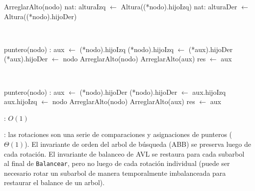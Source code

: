 \begin{Algoritmos}
	\begin{algorithm}[H]
		\NoCaptionOfAlgo
		\caption{}
		\BlankLine
		ArreglarAlto(nodo)
		nat: alturaIzq $\leftarrow$ Altura((*nodo).hijoIzq)
		nat: alturaDer $\leftarrow$ Altura((*nodo).hijoDer)
	\end{algorithm}

	~

	\begin{algorithm}[H]
		\NoCaptionOfAlgo
		\caption{}
		\BlankLine
		puntero(nodo) : aux $\leftarrow$ (*nodo).hijoIzq
		(*nodo).hijoIzq $\leftarrow$ (*aux).hijoDer
		(*aux).hijoDer $\leftarrow$ nodo
		ArreglarAlto(nodo)
		ArreglarAlto(aux)
		res $\leftarrow$ aux
	\end{algorithm}

	~

	\begin{algorithm}[H]
		\NoCaptionOfAlgo
		\caption{}
		\BlankLine
		puntero(nodo) : aux $\leftarrow$ (*nodo).hijoDer
		(*nodo).hijoDer $\leftarrow$ aux.hijoIzq
		aux.hijoIzq $\leftarrow$ nodo
		ArreglarAlto(nodo)
		ArreglarAlto(aux)
		res $\leftarrow$ aux
	\end{algorithm}
	
	\complejidad: $O(1)$

	\justifcomp: las rotaciones son una serie de comparaciones y asignaciones de punteros ($\Theta(1)$). El invariante de orden del arbol de búsqueda (ABB) se preserva luego de cada rotación. El invariante de balanceo de AVL se restaura para cada subarbol al final de \texttt{Balancear}, pero no luego de cada rotación individual (puede ser necesario rotar un subarbol de manera temporalmente imbalanceada para restaurar el balance de un arbol).


\end{Algoritmos}
